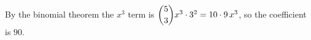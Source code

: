 By the binomial theorem the $x^3$ term is $\dbinom53x^3\cdot3^2=10\cdot9\,x^3$, so the coefficient is $\boxed{90}$.
